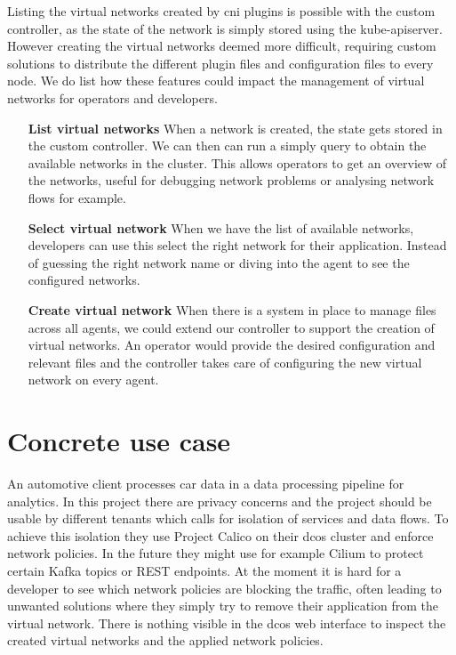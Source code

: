 Listing the virtual networks created by \gls{cni} plugins is possible with the custom controller, as the state of the network is simply stored using the kube-apiserver. However creating the virtual networks deemed more difficult, requiring custom solutions to distribute the different plugin files and configuration files to every node. We do list how these features could impact the management of virtual networks for operators and developers.
\begin{itemize}
    \item[\textbf{List virtual networks}] When a network is created, the state gets stored in the custom controller. We can then can run a simply query to obtain the available networks in the cluster. This allows operators to get an overview of the networks, useful for debugging network problems or analysing network flows for example.
    \item[\textbf{Select virtual network}] When we have the list of available networks, developers can use this select the right network for their application. Instead of guessing the right network name or diving into the agent to see the configured networks.
    \item[\textbf{Create virtual network}] When there is a system in place to manage files across all agents, we could extend our controller to support the creation of virtual networks. An operator would provide the desired configuration and relevant files and the controller takes care of configuring the new virtual network on every agent. 
\end{itemize}

\section{Concrete use case}
An automotive client processes car data in a data processing pipeline for analytics. In this project there are  privacy concerns and the project should be usable by different tenants which calls for isolation of services and data flows. To achieve this isolation they use Project Calico on their \gls{dcos} cluster and enforce network policies. In the future they might use for example Cilium to protect certain Kafka topics or REST endpoints. At the moment it is hard for a developer to see which network policies are blocking the traffic, often leading to unwanted solutions where they simply try to remove their application from the virtual network. There is nothing visible in the \gls{dcos} web interface to inspect the created virtual networks and the applied network policies.

